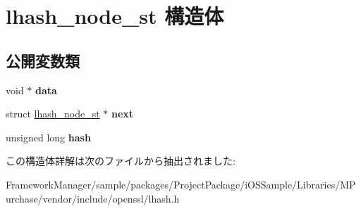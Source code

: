 \hypertarget{structlhash__node__st}{}\section{lhash\+\_\+node\+\_\+st 構造体}
\label{structlhash__node__st}
\subsection*{公開変数類}
\begin{DoxyCompactItemize}
\item 
\hypertarget{structlhash__node__st_a1bddfe54547a8c35edc658730d8edcb7}{}void $\ast$ {\bfseries data}\label{structlhash__node__st_a1bddfe54547a8c35edc658730d8edcb7}

\item 
\hypertarget{structlhash__node__st_a9756db4182d64ae6212672d2d1cea695}{}struct \hyperlink{structlhash__node__st}{lhash\+\_\+node\+\_\+st} $\ast$ {\bfseries next}\label{structlhash__node__st_a9756db4182d64ae6212672d2d1cea695}

\item 
\hypertarget{structlhash__node__st_adae3442cad55dbd25659909f8f15ced7}{}unsigned long {\bfseries hash}\label{structlhash__node__st_adae3442cad55dbd25659909f8f15ced7}

\end{DoxyCompactItemize}


この構造体詳解は次のファイルから抽出されました\+:\begin{DoxyCompactItemize}
\item 
Framework\+Manager/sample/packages/\+Project\+Package/i\+O\+S\+Sample/\+Libraries/\+M\+Purchase/vendor/include/openssl/lhash.\+h\end{DoxyCompactItemize}
